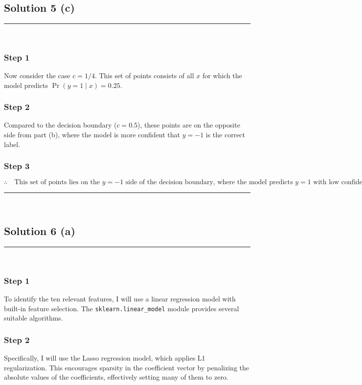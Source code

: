 \documentclass{article}
\begin{document}
\subsection*{Solution 5 (c)}
\noindent\rule{\textwidth}{0.4pt}\\

\subsubsection*{Step 1}
\parbox{\textwidth}{
Now consider the case $c = 1/4$. This set of points consists of all $x$ for which the model predicts $\operatorname{Pr}(y=1 \mid x) = 0.25$.
}

\subsubsection*{Step 2}
\parbox{\textwidth}{
Compared to the decision boundary ($c = 0.5$), these points are on the opposite side from part (b), where the model is more confident that $y=-1$ is the correct label.
}

\subsubsection*{Step 3}
\parbox{\textwidth}{
\[
\therefore \quad \text{This set of points lies on the $y=-1$ side of the decision boundary, where the model predicts $y=1$ with low confidence.}
\]
}

\noindent\rule{\textwidth}{0.4pt}\\

\newpage
\subsection*{Solution 6 (a)}
\noindent\rule{\textwidth}{0.4pt}\\

\subsubsection*{Step 1}
\parbox{\textwidth}{
To identify the ten relevant features, I will use a linear regression model with built-in feature selection. The \texttt{sklearn.linear\_model} module provides several suitable algorithms.
}

\subsubsection*{Step 2}
\parbox{\textwidth}{
Specifically, I will use the Lasso regression model, which applies L1 regularization. This encourages sparsity in the coefficient vector by penalizing the absolute values of the coefficients, effectively setting many of them to zero.
}
\end{document}
